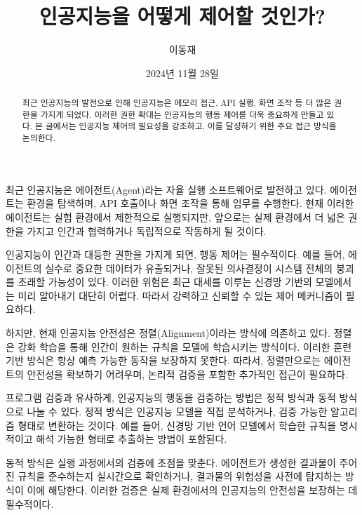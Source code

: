 \documentclass[11pt, oneside]{article}    %
\title{인공지능을 어떻게 제어할 것인가?}
\author{이동재}
\date{2024년 11월 28일}
\begin{document}
\maketitle

\begin{abstract}
    최근 인공지능의 발전으로 인해 인공지능은 메모리 접근, API 실행, 화면 조작 등 더 많은 권한을 가지게 되었다. 이러한 권한 확대는 인공지능의 행동 제어를 더욱 중요하게 만들고 있다. 본 글에서는 인공지능 제어의 필요성을 강조하고, 이를 달성하기 위한 주요 접근 방식을 논의한다.
\end{abstract}

최근 인공지능은 에이전트(Agent)라는 자율 실행 소프트웨어로 발전하고 있다. 에이전트는 환경을 탐색하며, API 호출이나 화면 조작을 통해 임무를 수행한다. 현재 이러한 에이전트는 실험 환경에서 제한적으로 실행되지만, 앞으로는 실제 환경에서 더 넓은 권한을 가지고 인간과 협력하거나 독립적으로 작동하게 될 것이다.

인공지능이 인간과 대등한 권한을 가지게 되면, 행동 제어는 필수적이다. 예를 들어, 에이전트의 실수로 중요한 데이터가 유출되거나, 잘못된 의사결정이 시스템 전체의 붕괴를 초래할 가능성이 있다. 이러한 위험은 최근 대세를 이루는 신경망 기반의 모델에서는 미리 알아내기 대단히 어렵다. 따라서 강력하고 신뢰할 수 있는 제어 메커니즘이 필요하다.

하지만, 현재 인공지능 안전성은 정렬(Alignment)이라는 방식에 의존하고 있다. 정렬은 강화 학습을 통해 인간이 원하는 규칙을 모델에 학습시키는 방식이다. 이러한 훈련 기반 방식은 항상 예측 가능한 동작을 보장하지 못한다. 따라서, 정렬만으로는 에이전트의 안전성을 확보하기 어려우며, 논리적 검증을 포함한 추가적인 접근이 필요하다.

프로그램 검증과 유사하게, 인공지능의 행동을 검증하는 방법은 정적 방식과 동적 방식으로 나눌 수 있다. 정적 방식은 인공지능 모델을 직접 분석하거나, 검증 가능한 알고리즘 형태로 변환하는 것이다. 예를 들어, 신경망 기반 언어 모델에서 학습한 규칙을 명시적이고 해석 가능한 형태로 추출하는 방법이 포함된다.

동적 방식은 실행 과정에서의 검증에 초점을 맞춘다. 에이전트가 생성한 결과물이 주어진 규칙을 준수하는지 실시간으로 확인하거나, 결과물의 위험성을 사전에 탐지하는 방식이 이에 해당한다. 이러한 검증은 실제 환경에서의 인공지능의 안전성을 보장하는 데 필수적이다.
\end{document}
